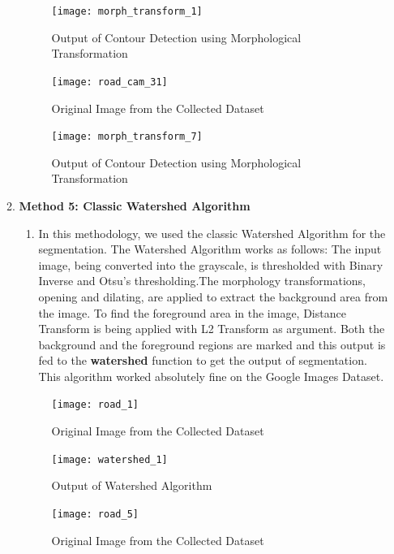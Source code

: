 \begin{enumerate}
\begin{enumerate}
    \begin{figure}[ht!]
        \centering
        \texttt{[image: morph\_transform\_1]}
        \caption{Output of Contour Detection using Morphological Transformation}
    \end{figure}
    \pagebreak
    
    \begin{figure}[ht!]
        \centering
        \texttt{[image: road\_cam\_31]}
        \caption{Original Image from the Collected Dataset}
    \end{figure}

    \begin{figure}[ht!]
        \centering
        \texttt{[image: morph\_transform\_7]}
        \caption{Output of Contour Detection using Morphological Transformation}
    \end{figure}
    \pagebreak
    
    \item \textbf{Method 5: Classic Watershed Algorithm}
    \begin{enumerate}
        \item In this methodology, we used the classic Watershed Algorithm for the segmentation. The Watershed Algorithm works as follows: The input image, being converted into the grayscale, is thresholded with Binary Inverse and Otsu's thresholding.The morphology transformations, opening and dilating, are applied to extract the background area from the image. To find the foreground area in the image, Distance Transform is being applied with L2 Transform as argument. Both the background and the foreground regions are marked and this output is fed to the \textbf{watershed} function to get the output of segmentation. This algorithm worked absolutely fine on the Google Images Dataset. 
    \end{enumerate}
    \begin{figure}[ht!]
        \centering
        \texttt{[image: road\_1]}
        \caption{Original Image from the Collected Dataset}
    \end{figure}

    \begin{figure}[ht!]
        \centering
        \texttt{[image: watershed\_1]}
        \caption{Output of Watershed Algorithm}
    \end{figure}
    \pagebreak
    
    \begin{figure}[ht!]
        \centering
        \texttt{[image: road\_5]}
        \caption{Original Image from the Collected Dataset}
    \end{figure}


\end{enumerate}
\end{enumerate}
